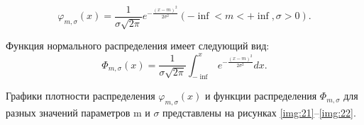 \documentclass[a4paper, 14pt, unknownkeysallowed]{extreport}
\begin{document}
\begin{equation}
	\varphi_{m,\sigma}(x) = \frac{1}{\sigma \sqrt{2\pi}} e^{-\frac{(x-m)^2}{2\sigma^2}} (-\inf<m<+\inf, \sigma > 0).
\end{equation}

Функция нормального распределения имеет следующий вид:
\begin{equation}
	\Phi_{m, \sigma}(x) = \frac{1}{\sigma \sqrt{2\pi}} \int_{-\inf}^{x} e^{-\frac{(x-m)^2}{2\sigma^2}} dx.
\end{equation}

Графики плотности распределения $\varphi_{m,\sigma}(x)$ и функции распределения $\Phi_{m, \sigma}$ для разных значений параметров m и $\sigma$ представлены на рисунках \ref{img:21}--\ref{img:22}.
\end{document}
